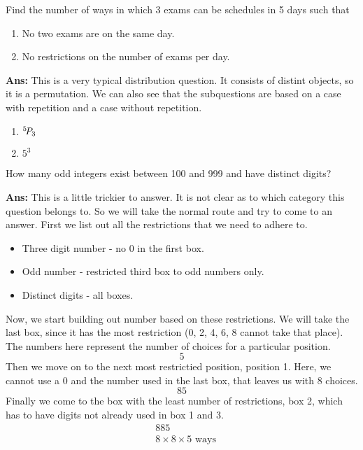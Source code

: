 \begin{example}
    Find the number of ways in which 3 exams can be schedules in 5 days such that \\
    \begin{enumerate}
        \item No two exams are on the same day.
        \item No restrictions on the number of exams per day.
    \end{enumerate}

    \textbf{Ans:} This is a very typical distribution question. It consists of distint objects, so it is a permutation. We can also see that the subquestions are based on a case with repetition and a case without repetition.
    \begin{enumerate}
        \item \mbox{${}^{5}\!P_{3}$}
        \item \mbox{$5^3$}
    \end{enumerate}
\end{example}

\begin{example}
    How many odd integers exist between 100 and 999 and have distinct digits?

    \textbf{Ans:} This is a little trickier to answer. It is not clear as to which category this question belongs to. So we will take the normal route and try to come to an answer. First we list out all the restrictions that we need to adhere to.
    \begin{itemize}
        \item Three digit number - no 0 in the first box.
        \item Odd number - restricted third box to odd numbers only.
        \item Distinct digits - all boxes.
    \end{itemize}
    Now, we start building out number based on these restrictions. We will take the last box, since it has the most restriction (0, 2, 4, 6, 8 cannot take that place). The numbers here represent the number of choices for a particular position.
    \[
        \boxed{}\boxed{}\boxed{5}
    \]
    Then we move on to the next most restrictied position, position 1. Here, we cannot use a 0 and the number used in the last box, that leaves us with 8 choices.
    \[
        \boxed{8}\boxed{}\boxed{5}
    \]
    Finally we come to the box with the least number of restrictions, box 2, which has to have digits not already used in box 1 and 3. 
    \begin{align*}
         & \boxed{8}\boxed{8}\boxed{5}      \\
         & 8 \times 8 \times 5 \text{ ways}
    \end{align*}
\end{example}

